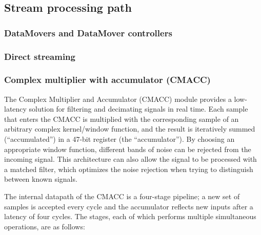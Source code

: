 \subsection{Stream processing path} \label{sec_stream_processing_path}

\subsubsection{DataMovers and DataMover controllers}

\subsubsection{Direct streaming}

\subsubsection{Complex multiplier with accumulator (CMACC)}


The Complex Multiplier and Accumulator (CMACC) module provides a low-latency solution for filtering and decimating signals in real time. Each sample that enters the CMACC is multiplied with the corresponding sample of an arbitrary complex kernel/window function, and the result is iteratively summed (``accumulated'') in a 47-bit register (the ``accumulator''). By choosing an appropriate window function, different bands of noise can be rejected from the incoming signal. This architecture can also allow the signal to be processed with a matched filter, which optimizes the noise rejection when trying to distinguish between known signals.

The internal datapath of the CMACC is a four-stage pipeline; a new set of samples is accepted every cycle and the accumulator reflects new inputs after a latency of four cycles. The stages, each of which performs multiple simultaneous operations, are as follows:


